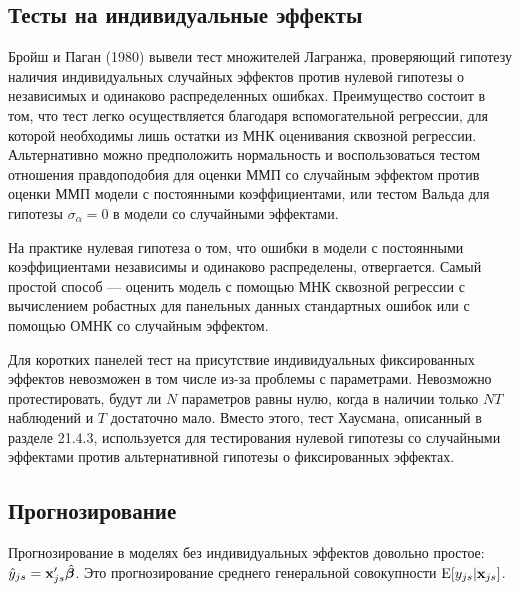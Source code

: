 \subsection{Тесты на индивидуальные эффекты}

Бройш и Паган (1980) вывели тест множителей Лагранжа, проверяющий гипотезу наличия индивидуальных случайных эффектов против нулевой гипотезы о независимых и одинаково распределенных ошибках. Преимущество состоит в том, что тест легко осуществляется благодаря вспомогательной регрессии, для которой необходимы лишь остатки из МНК оценивания сквозной регрессии. Альтернативно можно предположить нормальность и воспользоваться тестом отношения правдоподобия для  оценки ММП со случайным эффектом против оценки ММП модели с постоянными коэффициентами, или тестом Вальда для гипотезы $\sigma_{\alpha}=0$ в модели со случайными эффектами.

На практике нулевая гипотеза о том, что ошибки в модели с постоянными коэффициентами независимы и одинаково распределены, отвергается. Самый простой способ --- оценить модель с помощью МНК сквозной регрессии с вычислением робастных для панельных данных стандартных ошибок или с помощью ОМНК со случайным эффектом.

Для коротких панелей тест на присутствие индивидуальных фиксированных эффектов невозможен в том числе из-за проблемы с параметрами. Невозможно протестировать, будут ли $N$ параметров равны нулю, когда в наличии только $NT$ наблюдений и $T$ достаточно мало. Вместо этого, тест Хаусмана, описанный в разделе 21.4.3, используется для тестирования нулевой гипотезы со случайными эффектами против альтернативной гипотезы о фиксированных эффектах.

\subsection{Прогнозирование}

Прогнозирование в моделях без индивидуальных эффектов довольно простое: $\hat{y}_{js}=\mathbf{x}'_{js}\hat{\bm\beta}$. Это прогнозирование среднего генеральной совокупности $\mathrm E[y_{js}|\mathbf{x}_{js}]$.

